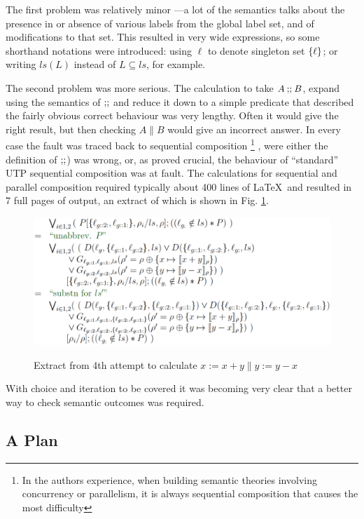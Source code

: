The first problem was relatively minor
---a lot of the semantics talks about the presence in or absence of
various labels from the global label set, and of modifications to that set.
This resulted in very wide expressions,
so some shorthand notations were introduced:
using $\ell$ to denote singleton set $\{{\ell}\}$;
or writing $ls(L)$ instead of $L \subseteq ls$, for example.

The second problem was more serious.
The calculation to take $A \mathbin{\mathbf{;\!;}} B$, expand using the semantics of $\mathbin{\mathbf{;\!;}}$
and reduce it down to a simple predicate that described the fairly obvious
correct behaviour was very lengthy. Often it would give the right result,
but then checking $A \parallel B$ would give an incorrect answer.
In every case the fault was traced back to sequential composition%
\footnote{
In the authors experience,
when building semantic theories involving concurrency or parallelism,
it is always sequential composition that causes the most difficulty
}
,
were either the definition of $\mathbin{\mathbf{;\!;}}$) was wrong, or, as proved crucial,
the behaviour of ``standard'' UTP sequential composition
was at fault.
The calculations for sequential and parallel composition
required typically about 400 lines of \LaTeX\ and resulted
in 7 full pages of output,
an extract of which is shown in Fig. \ref{fig:attempt4}.

\begin{figure}
  \centering
  \includegraphics[width=6in]{Attempt4.eps}\\
  \caption{Extract from 4th attempt to calculate $x:=x+y \parallel y:=y-x$}
  \label{fig:attempt4}
\end{figure}

With choice and iteration to be covered
it was becoming very clear that a better way to check semantic outcomes
was required.

\subsection{A Plan}\label{ssec:plan}

